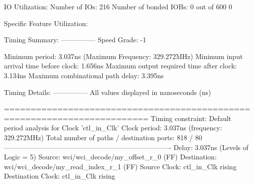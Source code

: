 \documentclass{article}
\begin{document}
IO Utilization: 
 Number of IOs:                         216
 Number of bonded IOBs:                   0  out of    600     0%

Specific Feature Utilization:

\fi
\iffalse
Timing Summary:
---------------
Speed Grade: -1

   Minimum period: 3.037ns (Maximum Frequency: 329.272MHz)
   Minimum input arrival time before clock: 1.656ns
   Maximum output required time after clock: 3.134ns
   Maximum combinational path delay: 3.395ns

Timing Details:
---------------
All values displayed in nanoseconds (ns)

=========================================================================
Timing constraint: Default period analysis for Clock 'ctl_in_Clk'
  Clock period: 3.037ns (frequency: 329.272MHz)
  Total number of paths / destination ports: 818 / 80
-------------------------------------------------------------------------
Delay:               3.037ns (Levels of Logic = 5)
  Source:            wci/wci_decode/my_offset_r_0 (FF)
  Destination:       wci/wci_decode/my_read_index_r_1 (FF)
  Source Clock:      ctl_in_Clk rising
  Destination Clock: ctl_in_Clk rising
\end{document}
